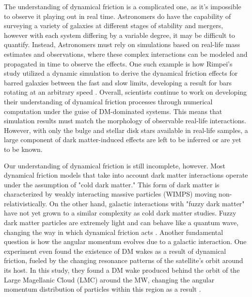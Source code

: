 \documentclass[fleqn,usenatbib]{mnras}
\begin{document}
\hspace{\parindent} The understanding of dynamical friction is a complicated one, as it's impossible to observe it playing out in real time. Astronomers do have the capability of surveying a variety of galaxies at different stages of stability and mergers, however with each system differing by a variable degree, it may be difficult to quantify. Instead, Astronomers must rely on simulations based on real-life mass estimates and observations, where these complex interactions can be modeled and propagated in time to observe the effects. One such example is how Rimpei's study utilized a dynamic simulation to derive the dynamical friction effects for barred galaxies between the fast and slow limits, developing a result for bars rotating at an arbitrary speed \citep{RimpeiChiba}. Overall, scientists continue to work on developing their understanding of dynamical friction processes through numerical computation under the guise of DM-dominated systems. This means that simulation results must match the morphology of observable real-life interactions. However, with only the bulge and stellar disk stars available in real-life samples, a large component of dark matter-induced effects are left to be inferred or are yet to be known. 

\vspace{10pt}


\hspace{\parindent} Our understanding of dynamical friction is still incomplete, however. Most dynamical friction models that take into account dark matter interactions operate under the assumption of "cold dark matter." This form of dark matter is characterized by weakly interacting massive particles (WIMPS) moving non-relativistically. On the other hand, galactic interactions with "fuzzy dark matter" have not yet grown to a similar complexity as cold dark matter studies. Fuzzy dark matter particles are extremely light and can behave like a quantum wave, changing the way in which dynamical friction acts \citep{Lancaster_2020}. Another fundamental question is how the angular momentum evolves due to a galactic interaction. One experiment even found the existence of DM wakes as a result of dynamical friction, fueled by the changing resonance patterns of the satellite's orbit around its host. In this study, they found a DM wake produced behind the orbit of the Large Magellanic Cloud (LMC) around the MW, changing the angular momentum distribution of particles within this region as a result \citep{Garavito-Camargo_2019}. 
\end{document}
